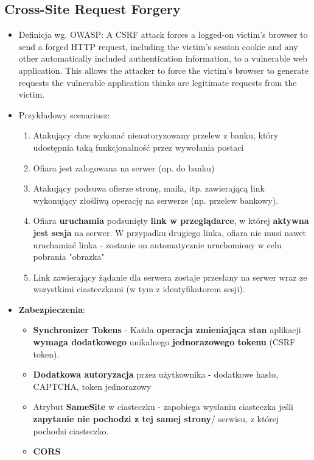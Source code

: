 \documentclass[../main.tex]{subfiles}
\begin{document}
    \subsection{Cross-Site Request Forgery}
    \begin{itemize}
        \item Definicja wg. OWASP: A CSRF attack forces a logged-on victim's browser to send a
        forged HTTP request, including the victim's session cookie and
        any other automatically included authentication information, to a
        vulnerable web application. This allows the attacker to force the
        victim's browser to generate requests the vulnerable application
        thinks are legitimate requests from the victim.
        \item Przykładowy scenariusz:
        \begin{enumerate}
            \item Atakujący chce wykonać nieautoryzowany przelew z banku, który udostępnia
            taką funkcjonalność przez wywołania postaci
            \item Ofiara jest zalogowana na serwer (np. do banku)
            \item Atakujący podsuwa ofierze stronę, maila, itp. zawierającą link wykonujący
            złośliwą operację na serwerze (np. przelew bankowy).
            \item Ofiara \textbf{uruchamia} podsunięty \textbf{link w przeglądarce}, w której \textbf{aktywna jest sesja}
            na serwer. W przypadku drugiego linka, ofiara nie musi nawet uruchamiać
            linka - zostanie on automatycznie uruchomiony w celu pobrania "obrazka"
            \item Link zawierający żądanie dla serwera zostaje przesłany na serwer wraz ze
            wszystkimi ciasteczkami (w tym z identyfikatorem sesji).
        \end{enumerate}
        \item \textbf{Zabezpieczenia}:
        \begin{itemize}
            \item \textbf{Synchronizer Tokens} - Każda \textbf{operacja zmieniająca stan} aplikacji \textbf{wymaga dodatkowego} unikalnego \textbf{jednorazowego tokenu} (CSRF token).
            \item \textbf{Dodatkowa autoryzacja} przez użytkownika - dodatkowe hasło, CAPTCHA, token jednorazowy
            \item Atrybut \textbf{SameSite} w ciasteczku - zapobiega wysłaniu ciasteczka jeśli \textbf{zapytanie nie pochodzi z tej samej strony}/
            serwisu, z której pochodzi ciasteczko.
            \item \textbf{CORS}
        \end{itemize}
    \end{itemize}
\end{document}
